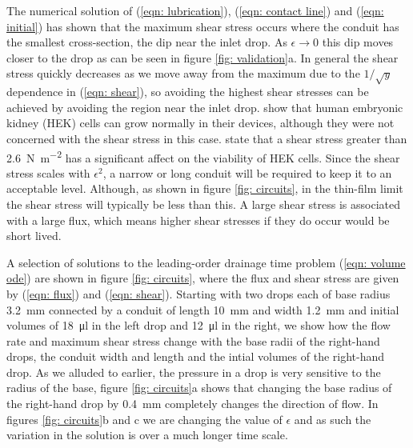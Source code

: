 \documentclass{jfm}
\begin{document}
The numerical solution of  (\ref{eqn: lubrication}), (\ref{eqn: contact line})  and (\ref{eqn: initial})   has shown that the maximum shear stress occurs where the  conduit  has the smallest cross-section, the dip near the inlet drop.
As $\epsilon \to0$ this dip moves closer to the drop as can be seen in  {f}igure \ref{fig: validation}a.
In general the shear stress quickly decreases as we move away from the maximum due to the   $ 1/\sqrt{y}$ dependence in (\ref{eqn: shear}), so avoiding the highest shear stresses can be achieved by avoiding the region  near the inlet drop. 
 \cite{Walsh2017MicrofluidicsWalls} show that human embryonic kidney (HEK)   cells can grow normally in their devices, although they were not concerned with the shear stress in this case.
 \cite{Stathopoulos1985ShearVitro} state that  a shear stress greater than \SI{2.6}{\newton \per \meter^2} has a significant affect on the  viability of HEK cells.
Since the  shear stress scales with $  \epsilon^2$, a narrow  or long  conduit  will be required to keep it to an acceptable level. 
Although, as shown in {f}igure \ref{fig: circuits}, in the thin-film limit the shear stress will typically be less than this.
A large shear stress is associated with a large flux, which means  higher shear stresses if they do occur would be short lived.


 
 A selection of solutions to the leading-order drainage time problem (\ref{eqn: volume ode}) are shown in {f}igure \ref{fig: circuits}, where the flux and shear stress are given by (\ref{eqn: flux}) and (\ref{eqn: shear}). 
 Starting with two drops each of base radius \SI{3.2}{\milli \meter} connected by a  conduit  of length \SI{10}{\milli \meter} and width \SI{1.2}{\milli \meter} and initial volumes of \SI{18}{\micro \litre}  in the left drop and \SI{12}{\micro \litre}  in the right, we show how the flow rate and maximum shear stress change with the  base radii of the  right-hand drops, the  conduit  width and length and the intial volumes of the  right-hand drop.
 As we alluded to earlier,  the pressure in a drop is very sensitive to the radius of the base,  figure \ref{fig: circuits}a  shows that changing the base radius of the right-hand drop by  \SI{0.4}{\milli \meter} completely changes the direction of flow.
 In figures  \ref{fig: circuits}b and c we are   changing the value of $ \epsilon $  and as such the variation in the solution is over a much longer time scale.
 
  
\end{document}
